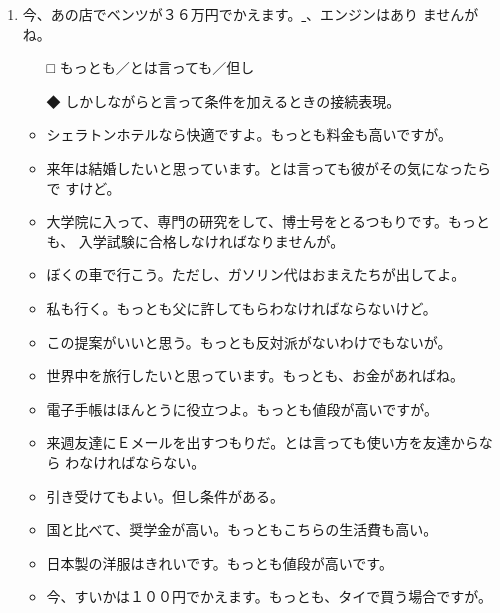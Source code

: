 \documentclass[
uplatex,
b5paper,
10pt,
dvipdfmx
]{jsbook}
\begin{document}
\begin{enumerate}
\item 今、あの店でベンツが３６万円でかえます。\underline{   }、エンジンはあり
      ませんがね。
\begin{itemize}
\item[□] もっとも／とは言っても／但し
\item[◆] しかしながらと言って条件を加えるときの接続表現。
\end{itemize}
\begin{itemize}
\item シェラトンホテルなら快適ですよ。もっとも料金も高いですが。
\item 来年は結婚したいと思っています。とは言っても彼がその気になったらで
      すけど。
\item 大学院に入って、専門の研究をして、博士号をとるつもりです。もっとも、
      入学試験に合格しなければなりませんが。
\item ぼくの車で行こう。ただし、ガソリン代はおまえたちが出してよ。
\item 私も行く。もっとも父に許してもらわなければならないけど。
\item この提案がいいと思う。もっとも反対派がないわけでもないが。
\item 世界中を旅行したいと思っています。もっとも、お金があればね。
\item 電子手帳はほんとうに役立つよ。もっとも値段が高いですが。
\item 来週友達にＥメールを出すつもりだ。とは言っても使い方を友達からなら
      わなければならない。
\item 引き受けてもよい。但し条件がある。
\item 国と比べて、奨学金が高い。もっともこちらの生活費も高い。
\item 日本製の洋服はきれいです。もっとも値段が高いです。
\item 今、すいかは１００円でかえます。もっとも、タイで買う場合ですが。
\end{itemize}


\end{enumerate}
\end{document}

